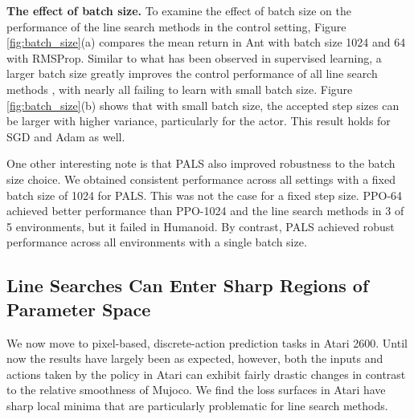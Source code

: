 \documentclass{article}
\begin{document}
\textbf{The effect of batch size. }
To examine the effect of batch size on the performance of the line search methods in the control setting, Figure \ref{fig:batch_size}(a) compares the mean return in Ant with batch size 1024 and 64 with RMSProp. Similar to what has been observed in supervised learning, a larger batch size greatly improves the control performance of all line search methods \citep{roulet2023interplay}, with nearly all failing to learn with small batch size. Figure \ref{fig:batch_size}(b) shows that with small batch size, the accepted step sizes can be larger with higher variance, particularly for the actor. This result holds for SGD and Adam as well.  

One other interesting note is that PALS also improved robustness to the batch size choice. We obtained consistent performance across all settings with a fixed batch size of 1024 for PALS. This was not the case for a fixed step size.  
PPO-64 achieved better performance than PPO-1024 and the line search methods in 3 of 5 environments, but it failed in Humanoid. By contrast, PALS achieved robust performance across all environments with a single batch size. 


\subsection{Line Searches Can Enter Sharp Regions of Parameter Space}  


We now move to pixel-based, discrete-action prediction tasks in Atari 2600. Until now the results have largely been as expected, however, both the inputs and actions taken by the policy in Atari can exhibit fairly drastic changes in contrast to the relative smoothness of Mujoco. We find the loss surfaces in Atari have sharp local minima that are particularly problematic for line search methods.
\end{document}

